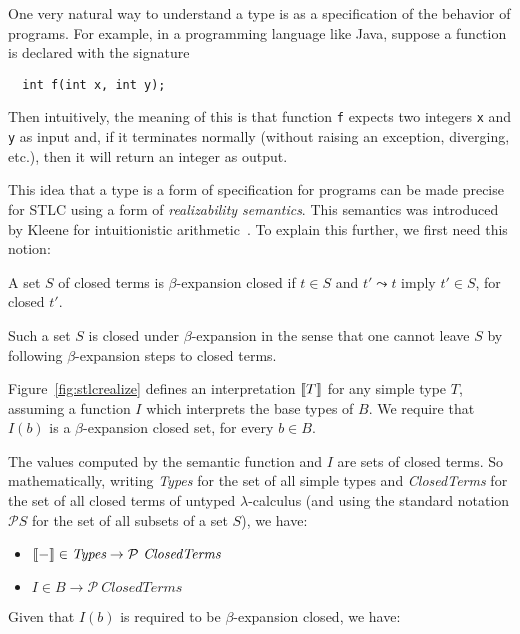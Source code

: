 One very natural way to understand a type is as a specification
of the behavior of programs.  For example, in a programming
language like Java, suppose a function is declared with the signature

\begin{verbatim}
  int f(int x, int y);
\end{verbatim}

\noindent Then intuitively, the meaning of this is that function
\verb|f| expects two integers \verb|x| and \verb|y| as input and, if
it terminates normally (without raising an exception, diverging,
etc.), then it will return an integer as output.

This idea that a type is a form of specification for programs can be
made precise for STLC using a form of \emph{realizability semantics}.  This semantics
was introduced by Kleene for intuitionistic arithmetic~\cite{kleene45}.  To explain
this further, we first need this notion:

\begin{definition}
  A set $S$ of closed terms is $\beta$-expansion closed if $t\in S$ and $t' \leadsto t$ imply $t' \in S$, for closed $t'$. 
\end{definition}

\noindent Such a set $S$ is closed under $\beta$-expansion in the
sense that one cannot leave $S$ by following $\beta$-expansion steps
to closed terms.

Figure~\ref{fig:stlcrealize} defines an interpretation $\llbracket T \rrbracket$
for any simple type $T$, assuming a function $I$ which interprets the
base types of $B$.  We require that $I(b)$ is a $\beta$-expansion
closed set, for every $b\in B$.


The values computed by the semantic function and $I$ are sets of closed terms.  So mathematically,
writing \textit{Types} for the set of all simple types and \textit{ClosedTerms} for the set
of all closed terms of untyped $\lambda$-calculus (and using the standard notation $\mathcal{P} S$ for
the set of all subsets of a set $S$), we have:
\begin{itemize}
\item $\llbracket - \rrbracket \in \textit{Types} \to \mathcal{P}\ \textit{ClosedTerms}$
\item $I \in B \to \mathcal{P}\ \textit{ClosedTerms}$
\end{itemize}

\noindent Given that $I(b)$ is required to be $\beta$-expansion closed, we have:

